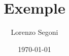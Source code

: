 \documentclass[12pt,a4paper]{book}
\numberwithin{equation}{chapter}
\theoremstyle{definition}
\theoremstyle{plain}
\begin{document}
\frontmatter
\title{Exemple}
\author{Lorenzo Segoni}
\date{\today}
\maketitle

\tableofcontents

\mainmatter



\end{document}

